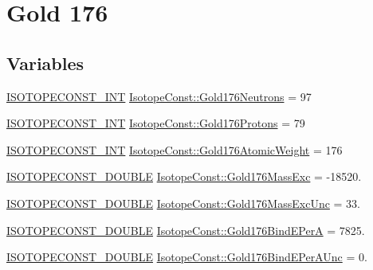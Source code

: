 \hypertarget{group___isotope_const-_gold-_au176}{}\section{Gold 176}
\label{group___isotope_const-_gold-_au176}
\subsection*{Variables}
\begin{DoxyCompactItemize}
\item 
\mbox{\hyperlink{group___isotope_const-_macros_ga5f18360b3e99483a35c32d789e62621c}{I\+S\+O\+T\+O\+P\+E\+C\+O\+N\+S\+T\+\_\+\+I\+NT}} \mbox{\hyperlink{group___isotope_const-_gold-_au176_ga349d8a65144512e55aab983b0e68378a}{Isotope\+Const\+::\+Gold176\+Neutrons}} = 97
\item 
\mbox{\hyperlink{group___isotope_const-_macros_ga5f18360b3e99483a35c32d789e62621c}{I\+S\+O\+T\+O\+P\+E\+C\+O\+N\+S\+T\+\_\+\+I\+NT}} \mbox{\hyperlink{group___isotope_const-_gold-_au176_ga8d6887bff696df51e53da5f0290b3df9}{Isotope\+Const\+::\+Gold176\+Protons}} = 79
\item 
\mbox{\hyperlink{group___isotope_const-_macros_ga5f18360b3e99483a35c32d789e62621c}{I\+S\+O\+T\+O\+P\+E\+C\+O\+N\+S\+T\+\_\+\+I\+NT}} \mbox{\hyperlink{group___isotope_const-_gold-_au176_gaba9eef24ffda30dec239ee4c657771ce}{Isotope\+Const\+::\+Gold176\+Atomic\+Weight}} = 176
\item 
\mbox{\hyperlink{group___isotope_const-_macros_ga8f45a7272ce02c0b4c65c44636ed719a}{I\+S\+O\+T\+O\+P\+E\+C\+O\+N\+S\+T\+\_\+\+D\+O\+U\+B\+LE}} \mbox{\hyperlink{group___isotope_const-_gold-_au176_ga4518aeccaff216510f5fb986c7d01267}{Isotope\+Const\+::\+Gold176\+Mass\+Exc}} = -\/18520.
\item 
\mbox{\hyperlink{group___isotope_const-_macros_ga8f45a7272ce02c0b4c65c44636ed719a}{I\+S\+O\+T\+O\+P\+E\+C\+O\+N\+S\+T\+\_\+\+D\+O\+U\+B\+LE}} \mbox{\hyperlink{group___isotope_const-_gold-_au176_gaa7cd985568999627dbd87fcd15fd5f9a}{Isotope\+Const\+::\+Gold176\+Mass\+Exc\+Unc}} = 33.
\item 
\mbox{\hyperlink{group___isotope_const-_macros_ga8f45a7272ce02c0b4c65c44636ed719a}{I\+S\+O\+T\+O\+P\+E\+C\+O\+N\+S\+T\+\_\+\+D\+O\+U\+B\+LE}} \mbox{\hyperlink{group___isotope_const-_gold-_au176_gaa520b1e75f6cb431baa468dd5836e647}{Isotope\+Const\+::\+Gold176\+Bind\+E\+PerA}} = 7825.
\item 
\mbox{\hyperlink{group___isotope_const-_macros_ga8f45a7272ce02c0b4c65c44636ed719a}{I\+S\+O\+T\+O\+P\+E\+C\+O\+N\+S\+T\+\_\+\+D\+O\+U\+B\+LE}} \mbox{\hyperlink{group___isotope_const-_gold-_au176_ga6e1172362fade3f09009c6ec307e80b1}{Isotope\+Const\+::\+Gold176\+Bind\+E\+Per\+A\+Unc}} = 0.

\end{DoxyCompactItemize}
